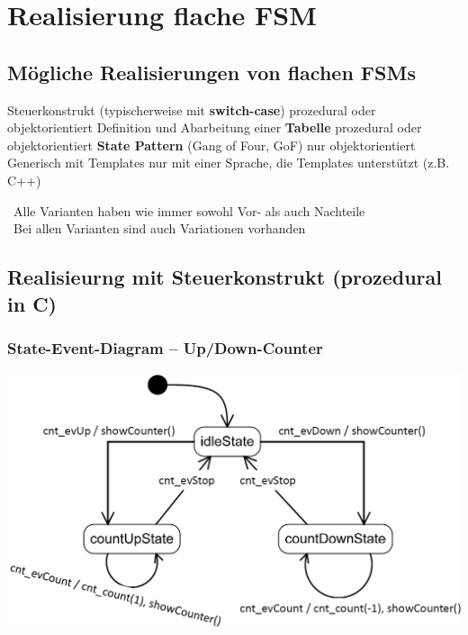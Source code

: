 \section{Realisierung flache FSM}

\subsection{Mögliche Realisierungen von flachen FSMs}

\begin{outline}
    \1 Steuerkonstrukt (typischerweise mit \textbf{switch-case})
        \2 prozedural oder objektorientiert
    \1 Definition und Abarbeitung einer \textbf{Tabelle}
        \2 prozedural oder objektorientiert
    \1 \textbf{State Pattern} (Gang of Four, GoF)
        \2 nur objektorientiert
    \1 Generisch mit Templates
        \2 nur mit einer Sprache, die Templates unterstützt (z.B. C++)
\end{outline}

\vspace{0.2cm}

\textrightarrow\ Alle Varianten haben wie immer sowohl Vor- als auch Nachteile \\
\textrightarrow\ Bei allen Varianten sind auch Variationen vorhanden


\subsection{Realisieurng mit Steuerkonstrukt (prozedural in C)}

\subsubsection{State-Event-Diagram -- Up/Down-Counter}

\begin{center}
    \includegraphics[width=0.7\columnwidth]{images/fsm_up-down-counter_diagramm_C.png}
\end{center}


